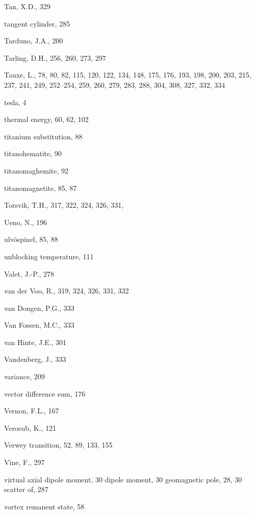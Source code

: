\documentclass[,plain]{tauxe}
\begin{document}
\begin{theindex}
  \indexspace

  \item Tan, X.D., 329
  \item tangent cylinder, 285
  \item Tarduno, J.A., 200
  \item Tarling, D.H., 256, 260, 273, 297
  \item Tauxe, L., 78, 80, 82, 115, 120, 122, 134, 148, 175, 176, 193, 
		198, 200, 203, 215, 237, 241, 249, 252--254, 259, 260, 
		279, 283, 288, 304, 308, 327, 332, 334
  \item tesla, 4
  \item thermal energy, 60, 62, 102
  \item titanium substitution, 88
  \item titanohematite, 90
  \item titanomaghemite, 92
  \item titanomagnetite, 85, 87
  \item Torsvik, T.H., 317, 322, 324, 326, 331,

  \indexspace

  \item Ueno, N., 196
  \item ulv\"ospinel, 85, 88
  \item unblocking temperature, 111

  \indexspace

  \item Valet, J.-P., 278
  \item van der Voo, R., 319, 324, 326, 331, 332
  \item van Dongen, P.G., 333
  \item Van Fossen, M.C., 333
  \item van Hinte, J.E., 301
  \item Vandenberg, J., 333
  \item variance, 209
  \item vector difference sum, 176
  \item Vernon, F.L., 167
  \item Verosub, K., 121
  \item Verwey transition, 52, 89, 133, 155
  \item Vine, F., 297
  \item virtual
    \subitem axial dipole moment, 30
    \subitem dipole moment, 30
    \subitem geomagnetic pole, 28, 30
      \subsubitem scatter of, 287
  \item vortex remanent state, 58


\end{theindex}
\end{document}
